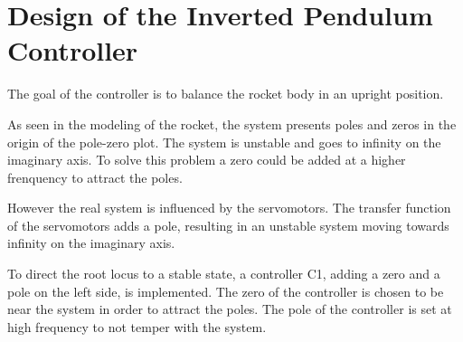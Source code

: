 \graphicspath{{figures/Design/IPController/}}
\chapter{Design of the Inverted Pendulum Controller}\label{sec:IPController}
The goal of the controller is to balance the rocket body in an upright position. 

As seen in the modeling of the rocket, the system presents poles and zeros in the origin of the pole-zero plot. The system is unstable and goes to infinity on the imaginary axis. To solve this problem a zero could be added at a higher frenquency to attract the poles.

%	
%	

However the real system is influenced by the servomotors. The transfer function of the servomotors adds a pole, resulting in an unstable system moving towards infinity on the imaginary axis. 
				

To direct the root locus to a stable state, a controller C1, adding a zero and a pole on the left side, is implemented. The zero of the controller is chosen to be near the system in order to attract the poles. The pole of the controller is set at high frequency to not temper with the system. 


